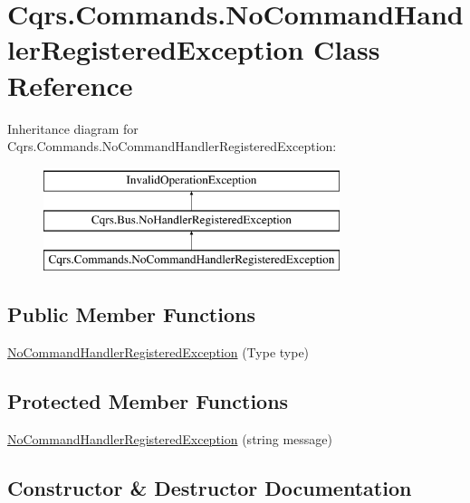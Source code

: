 \hypertarget{classCqrs_1_1Commands_1_1NoCommandHandlerRegisteredException}{}\section{Cqrs.\+Commands.\+No\+Command\+Handler\+Registered\+Exception Class Reference}
\label{classCqrs_1_1Commands_1_1NoCommandHandlerRegisteredException}
Inheritance diagram for Cqrs.\+Commands.\+No\+Command\+Handler\+Registered\+Exception\+:\begin{figure}[H]
\begin{center}
\leavevmode
\includegraphics[height=3.000000cm]{classCqrs_1_1Commands_1_1NoCommandHandlerRegisteredException}
\end{center}
\end{figure}
\subsection*{Public Member Functions}
\begin{DoxyCompactItemize}
\item 
\hyperlink{classCqrs_1_1Commands_1_1NoCommandHandlerRegisteredException_a7b6f2d7fd69a4369e12eba36598e1055}{No\+Command\+Handler\+Registered\+Exception} (Type type)
\end{DoxyCompactItemize}
\subsection*{Protected Member Functions}
\begin{DoxyCompactItemize}
\item 
\hyperlink{classCqrs_1_1Commands_1_1NoCommandHandlerRegisteredException_a4adad818f3b1a908cd2f9d7e34aad627}{No\+Command\+Handler\+Registered\+Exception} (string message)
\end{DoxyCompactItemize}


\subsection{Constructor \& Destructor Documentation}
\mbox{\label{classCqrs_1_1Commands_1_1NoCommandHandlerRegisteredException_a7b6f2d7fd69a4369e12eba36598e1055}} 
